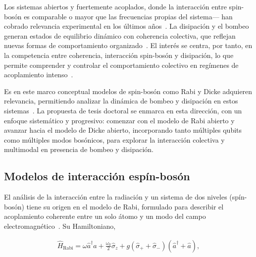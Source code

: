 \documentclass[onecolumn,notitlepage,letterpaper,aps,pra,12pt]{article}
\numberwithin{equation}{section}
\begin{document}
Los sistemas abiertos y fuertemente acoplados, donde la interacción entre spin-bosón es comparable o mayor que las frecuencias propias del sistema— han cobrado relevancia experimental en los últimos años~\cite{Grifoni1999,ZhangHou2015,Burger2022,Fazio2025}. La disipación y el bombeo generan estados de equilibrio dinámico con coherencia colectiva, que reflejan nuevas formas de comportamiento organizado~\cite{Sieberer2016,Halati2020,Chelpanova2025}. El interés se centra, por tanto, en la competencia entre coherencia, interacción spin-bosón y disipación, lo que permite comprender y controlar el comportamiento colectivo en regímenes de acoplamiento intenso~\cite{subasi2012,FornDiaz2019,Kirton2018,LeBoite2020,roses2020}.

Es en este marco conceptual modelos de spin-bosón como Rabi y Dicke adquieren relevancia, permitiendo analizar la dinámica de bombeo y disipación en estos sistemas~\cite{henriet2014,hwang2018,DiBello2024-2,Nagy10,Klinder15}. La propuesta de tesis doctoral se enmarca en esta dirección, con un enfoque sistemático y progresivo: comenzar con el modelo de Rabi abierto y avanzar hacia el modelo de Dicke abierto, incorporando tanto múltiples qubits como múltiples modos bosó\-nicos, para explorar la interacción colectiva y multimodal en presencia de bombeo y disipación.


\subsection{Modelos de interacción espín-bosón}

El análisis de la interacción entre la radiación y un sistema de dos niveles (spín-bosón) tiene su origen en el modelo de Rabi, formulado para describir el acoplamiento coherente entre un solo átomo y un modo del campo electromagnético~\cite{rabi1936}. Su Hamiltoniano,

\begin{gather}
    \hat{H}_{\text{Rabi}} = \omega\hat{a}^{\dagger}\hat{a} + \frac{\omega_{0}}{2}\hat{\sigma}_{z} + g\left( \hat{\sigma}_{+} + \hat{\sigma}_{-} \right)\left( \hat{a}^{\dagger} + \hat{a} \right),
\end{gather}
\end{document}
